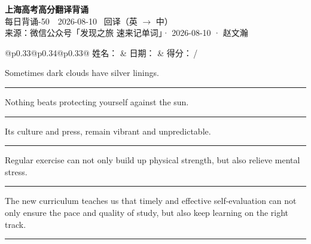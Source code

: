 \documentclass[11pt,a4paper]{article}
\newcommand{\num}[1]{\makebox[1.9em][r]{#1.}\hspace{0.3em}}
\newcommand{\wline}{\noindent\rule{\linewidth}{0.4pt}}
\begin{document}
\pagestyle{plain}
\begin{center}
{\LARGE\bfseries 上海高考高分翻译背诵 }\\[0.25em]
{\large 每日背诵-50　2026-08-10 \quad\ 回译（英 $\to$ 中）}\\[0.35em]
{\footnotesize 来源：微信公众号「发现之旅 速来记单词」· 2026-08-10 · 赵文瀚}
\end{center}

\vspace{0.4em}
\noindent\begin{tabular}{@{}p{0.33\textwidth}@{}p{0.34\textwidth}@{}p{0.33\textwidth}@{}}
姓名：\underline{\hspace{2.0cm}} & 日期：\underline{\hspace{2.0cm}} & 得分：\underline{\hspace{1.4cm}}\,/ \\
\end{tabular}

\vspace{0.5em}

\vspace{0.8em}
\num{1}Sometimes dark clouds have silver linings.

\vspace{0.25em}

\wline

\num{2}Nothing beats protecting yourself against the sun.

\vspace{0.25em}

\wline

\num{3}Its culture and press, remain vibrant and unpredictable.

\vspace{0.25em}

\wline

\num{4}Regular exercise can not only build up physical strength, but also relieve mental stress.

\vspace{0.25em}

\wline

\num{5}The new curriculum teaches us that timely and effective self-evaluation can not only ensure the pace and quality of study, but also keep learning on the right track.

\vspace{0.25em}

\wline
\end{document}
